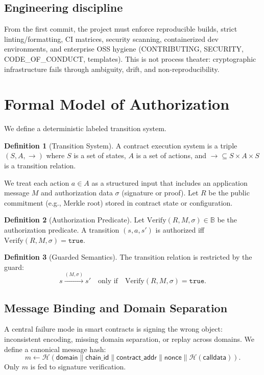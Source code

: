 \documentclass[conference]{IEEEtran}
\theoremstyle{definition}
\newtheorem{definition}{Definition}
\theoremstyle{plain}
\theoremstyle{remark}
\newcommand{\B}{\mathbb{B}}
\newcommand{\concat}{\mathbin{\|}}
\newcommand{\Verify}{\mathrm{Verify}}
\newcommand{\Hash}{\mathcal{H}}
\begin{document}
\subsection*{Engineering discipline}
From the first commit, the project must enforce reproducible builds, strict linting/formatting, CI matrices, security scanning, containerized dev environments, and enterprise OSS hygiene (CONTRIBUTING, SECURITY, CODE\_OF\_CONDUCT, templates). This is not process theater: cryptographic infrastructure fails through ambiguity, drift, and non-reproducibility.

\section{Formal Model of Authorization}
We define a deterministic labeled transition system.

\begin{definition}[Transition System]
A contract execution system is a triple $(S, A, \rightarrow)$ where $S$ is a set of states, $A$ is a set of actions, and $\rightarrow \subseteq S \times A \times S$ is a transition relation.
\end{definition}

We treat each action $a \in A$ as a structured input that includes an application message $M$ and authorization data $\sigma$ (signature or proof). Let $R$ be the public commitment (e.g., Merkle root) stored in contract state or configuration.

\begin{definition}[Authorization Predicate]
\label{def:auth}
Let $\Verify(R,M,\sigma)\in\B$ be the authorization predicate. A transition $(s,a,s')$ is authorized iff $\Verify(R,M,\sigma)=\texttt{true}$.
\end{definition}

\begin{definition}[Guarded Semantics]
The transition relation is restricted by the guard:
\[
s \xrightarrow{(M,\sigma)} s' \quad \text{only if} \quad \Verify(R,M,\sigma)=\texttt{true}.
\]
\end{definition}

\subsection*{Message Binding and Domain Separation}
A central failure mode in smart contracts is signing the wrong object: inconsistent encoding, missing domain separation, or replay across domains. We define a canonical message hash:
\[
m \gets \Hash(\textsf{domain} \concat \textsf{chain\_id} \concat \textsf{contract\_addr} \concat \textsf{nonce} \concat \Hash(\textsf{calldata})).
\]
Only $m$ is fed to signature verification.
\end{document}
